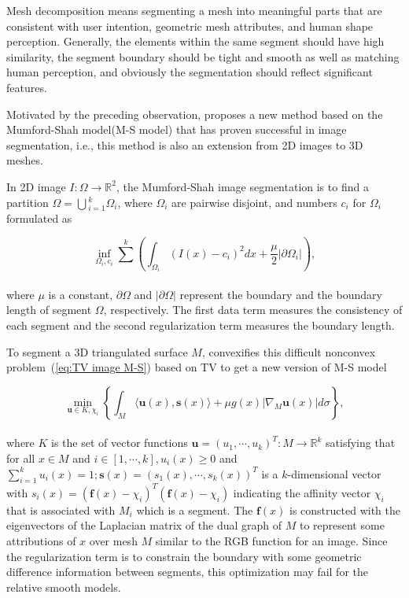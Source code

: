 Mesh decomposition means segmenting a mesh into meaningful parts that are consistent with user intention, geometric mesh attributes, and human shape perception.
Generally, the elements within the same segment should have high similarity, the segment boundary should be tight and smooth as well as matching human perception, and obviously the segmentation should reflect significant features.

Motivated by the preceding observation, \cite{zhang2012variational} proposes a new method based on the Mumford-Shah model(M-S model)\cite{mumford1989optimal} that has proven successful in image segmentation, i.e., this method is also an extension from 2D images to 3D meshes.

In 2D image $I:\Omega\rightarrow \mathbb{R}^2$, the Mumford-Shah image segmentation is to find a partition $\Omega=\bigcup{_{i=1}^{k}}\Omega_{i}$, where $\Omega_{i}$ are pairwise disjoint, and numbers $c_{i}$ for $\Omega_{i}$ formulated as

\small{
\begin{equation}
 \label{eq:TV image M-S}
 \inf_{\Omega_{i},c_{i}} \sum_{}^{k}
 ( \int_{\Omega_{i}}^{} (I(x)-c_{i})^2dx + \frac{\mu}{2} | \partial\Omega_{i} | ),
\end{equation}
}
\\
where $\mu$ is a constant, $\partial \Omega$ and $|\partial \Omega|$ represent the boundary and the boundary length of segment $\Omega$, respectively.
The first data term measures the consistency of each segment and the second regularization term measures the boundary length.

To segment a 3D triangulated surface $M$, \cite{zhang2012variational} convexifies this difficult nonconvex problem~(\ref{eq:TV image M-S}) based on TV to get a new version of M-S model

\small{
\begin{equation}
 \label{eq:TV surface M-S}
 \min_{\mathbf{u}\in K, \chi_{i}} \left \{
 \int_{M}\langle\mathbf{u}(x), \mathbf{s}(x)\rangle +
 \mu g(x)| \nabla_{M}\mathbf{u}(x) | d\sigma
 \right\},
\end{equation}
}
\\
where $K$ is the set of vector functions $\mathbf{u}=(u_1,\cdots,u_{k})^{T}:M\rightarrow \mathbb{R}^{k}$ satisfying that for all $x\in M$ and $i\in [1,\cdots,k],u_{i}(x)\geq0$ and
$\sum_{i=1}^{k}u_{i}(x)=1; \mathbf{s}(x)=(s_1(x),\cdots,s_k(x))^T$ is a $k$-dimensional vector with $s_i(x)=(\mathbf{f}(x)-\chi_{i})^{T}(\mathbf{f}(x)-\chi_{i})$ indicating
the affinity vector $\chi_{i}$ that is associated with $M_{i}$ which is a segment.
The $\mathbf{f}(x)$ is constructed with the eigenvectors of the Laplacian matrix of the dual graph of $M$ to represent some attributions of $x$ over mesh $M$ similar to the RGB function for an image.
Since the regularization term is to constrain the boundary with some geometric difference information between segments, this optimization may fail for the relative smooth models.


